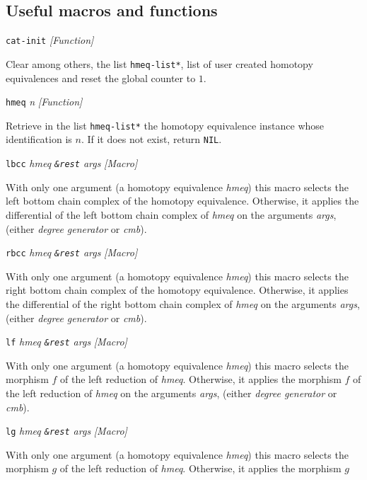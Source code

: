 \subsection {Useful macros and functions}

{\parindent=0mm
{\leftskip=5mm
{\tt cat-init} \hfill {\em [Function]} \par}
{\leftskip=15mm
Clear among others, the list {\tt *hmeq-list*}, list of user created homotopy equivalences  and reset
the global counter to $1$. \par}
{\leftskip=5mm
{\tt hmeq} {\em n} \hfill {\em [Function]} \par}
{\leftskip=15mm
Retrieve in the list {\tt *hmeq-list*} the  homotopy equivalence  instance whose identification
is $n$. If it does not exist, return {\tt NIL}. \par}
{\leftskip=5mm
{\tt lbcc} {\em hmeq {\tt \&rest} args} \hfill {\em [Macro]} \par}
{\leftskip=15mm
With only one argument (a homotopy equivalence {\em hmeq}) this macro selects
the left bottom chain complex of the homotopy equivalence. Otherwise, it applies  the differential
of the left bottom chain complex of  {\em hmeq} on the arguments {\em args},
(either {\em degree generator} or {\em cmb}).  \par}
{\leftskip=5mm
{\tt rbcc} {\em hmeq {\tt \&rest} args} \hfill {\em [Macro]} \par}
{\leftskip=15mm
With only one argument (a homotopy equivalence {\em hmeq}) this macro selects
the right bottom chain complex of the homotopy equivalence. Otherwise, it applies  the differential
of the right  bottom chain complex of  {\em hmeq} on the arguments {\em args},
(either {\em degree generator} or {\em cmb}).  \par}
{\leftskip=5mm
{\tt lf} {\em hmeq {\tt \&rest} args} \hfill {\em [Macro]} \par}
{\leftskip=15mm
With only one argument (a homotopy equivalence {\em hmeq}) this macro selects
the morphism $f$ of the left reduction of {\em hmeq}. Otherwise, it applies  the morphism $f$
of the left reduction of {\em hmeq} on the arguments {\em args},
(either {\em degree generator} or {\em cmb}).  \par}
{\leftskip=5mm
{\tt lg} {\em hmeq {\tt \&rest} args} \hfill {\em [Macro]} \par}
{\leftskip=15mm
With only one argument (a homotopy equivalence {\em hmeq}) this macro selects
the morphism $g$ of the left reduction of {\em hmeq}. Otherwise, it applies  the morphism $g$
}}
